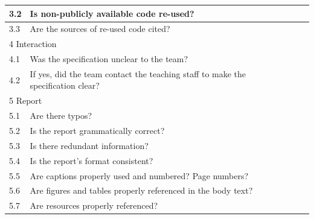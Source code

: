 \documentclass[%
	a4paper,
]
{article}
\begin{document}
\begin{table}[h!]
\begin{tabular}{
		|p{.025\linewidth}
		|p{.75\linewidth}
		|p{.05\linewidth}
		|p{.05\linewidth}|
	}
		3.2 & Is non-publicly available code re-used? & & \\\hline

		3.3 & Are the sources of re-used code cited? & & \\\hline

		\multicolumn{4}{|p{.95\linewidth}|}{\cellcolor{gray!20} 4 Interaction}
			\\\hline

		4.1 & Was the specification unclear to the team? & & \\\hline

		4.2 & If yes, did the team contact the teaching staff to make the specification
			clear? & & \\\hline

		\multicolumn{4}{|p{.95\linewidth}|}{\cellcolor{gray!20} 5 Report}
			\\\hline

		5.1 & Are there typos? & & \\\hline

		5.2 & Is the report grammatically correct? & & \\\hline

		5.3 & Is there redundant information? & & \\\hline

		5.4 & Is the report's format consistent? & & \\\hline

		5.5 & Are captions properly used and numbered? Page numbers? & & \\\hline

		5.6 & Are figures and tables properly referenced in the body text?
			& & \\\hline

		5.7 & Are resources properly referenced? & & \\\hline


		\hline

	\end{tabular}
\end{table}
%
%
%
\printbibliography
%
%
\end{document}
